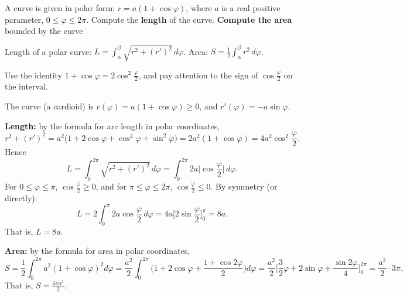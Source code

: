 
\begin{question}
A curve is given in polar form: $r=a(1+\cos\varphi)$, where $a$ is a real positive parameter, $0\le\varphi\le2\pi$.
Compute the \textbf{length} of the curve. \textbf{Compute the area} bounded by the curve
\end{question}

\begin{hint}
Length of a polar curve: $L=\int_\alpha^\beta\sqrt{r^2+(r')^2}\,d\varphi$. Area: $S=\frac12\int_\alpha^\beta r^2\,d\varphi$.
\end{hint}

\begin{hint}
Use the identity $1+\cos\varphi=2\cos^2\frac{\varphi}{2}$, and pay attention to the sign of $\cos\frac\varphi2$ on the interval.
\end{hint}

\begin{solution}
The curve (a cardioid) is $r(\varphi)=a(1+\cos\varphi)\ge0$, and $r'(\varphi)=-a\sin\varphi$.

\textbf{Length:} by the formula for arc length in polar coordinates,
\[ r^2+(r')^2=a^2\big(1+2\cos\varphi+\cos^2\varphi+\sin^2\varphi\big)=2a^2(1+\cos\varphi)=4a^2\cos^2\frac{\varphi}{2}. \]
Hence
\[ L=\int_0^{2\pi}\sqrt{r^2+(r')^2}\,d\varphi=\int_0^{2\pi}2a\Big|\cos\frac{\varphi}{2}\Big|\,d\varphi . \]
For $0\le\varphi\le\pi$, $\cos\frac\varphi2\ge0$, and for $\pi\le\varphi\le2\pi$, $\cos\frac\varphi2\le0$. By symmetry (or directly):
\[ L=2\int_0^{\pi}2a\cos\frac{\varphi}{2}\,d\varphi=4a\Big[2\sin\frac\varphi2\Big]_0^{\pi}=8a . \]
That is, $\boxed{L=8a}$.

\textbf{Area:} by the formula for area in polar coordinates,
\[ S=\frac12\int_0^{2\pi}a^2(1+\cos\varphi)^2d\varphi=\frac{a^2}{2}\int_0^{2\pi}\Big(1+2\cos\varphi+\frac{1+\cos2\varphi}{2}\Big)d\varphi
=\frac{a^2}{2}\Big[\frac32\varphi+2\sin\varphi+\frac{\sin2\varphi}{4}\Big]_0^{2\pi}=\frac{a^2}{2}\cdot3\pi . \]
That is, $\boxed{S=\frac{3\pi a^2}{2}}$.
\end{solution}
